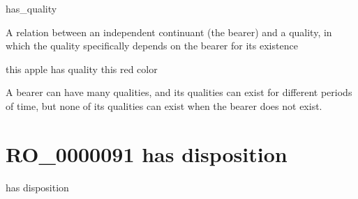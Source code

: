 \documentclass[letterpaper,10pt,english]{sphinxmanual}
\begin{document}
\begin{sphinxShadowBox}

\sphinxAtStartPar
has\_quality
\end{sphinxShadowBox}

\begin{sphinxShadowBox}

\sphinxAtStartPar
A relation between an independent continuant (the bearer) and a quality, in which the quality specifically depends on the bearer for its existence
\end{sphinxShadowBox}

\begin{sphinxShadowBox}

\sphinxAtStartPar
this apple has quality this red color
\end{sphinxShadowBox}

\begin{sphinxShadowBox}

\sphinxAtStartPar
A bearer can have many qualities, and its qualities can exist for different periods of time, but none of its qualities can exist when the bearer does not exist.
\end{sphinxShadowBox}

\begin{sphinxShadowBox}

\sphinxAtStartPar
{}
\end{sphinxShadowBox}
\begin{quote}
\label{\detokenize{doc-RO_0000091:ro-0000091}}\label{\detokenize{doc-RO_0000091:has-disposition}}\label{\detokenize{doc-RO_0000091:ro-0000091}}
\ignorespaces \end{quote}


\section{RO\_0000091 \sphinxhyphen{} has disposition}
\label{\detokenize{doc-RO_0000091:ro-0000091-has-disposition}}\label{\detokenize{doc-RO_0000091:index-0}}\label{\detokenize{doc-RO_0000091::doc}}
\begin{sphinxShadowBox}

\sphinxAtStartPar
has disposition
\end{sphinxShadowBox}
\end{document}

